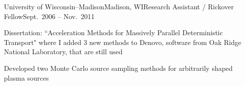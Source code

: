\begin{rSubsection}{University of Wisconsin--Madison}{Madison, WI}{Research Assistant / Rickover Fellow}{Sept.\ 2006 -- Nov.\ 2011}
\item Dissertation: ``Acceleration Methods for Massively Parallel Deterministic Transport" where I added 3 new methods to Denovo, software from Oak Ridge National Laboratory, that are still used%
\item Developed two Monte Carlo source sampling methods for arbitrarily shaped plasma sources%
\end{rSubsection}





